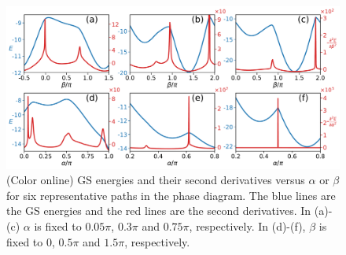 \documentclass[aps,prb,reprint,amsfonts,amsmath,amssymb,showpacs,groupedaddress,superscriptaddress]{revtex4-1}
\begin{document}
\begin{figure}
    \centering
    \includegraphics[width=\columnwidth]{fig/SecondDerivatives46.pdf}
    \caption{\label{fig:SecondDerivatives46} (Color online) GS energies and their second derivatives versus $\alpha$ or $\beta$ for six representative paths in the phase diagram.  The blue lines are the GS energies and the red lines are the second derivatives. In (a)-(c) $\alpha$ is fixed to $0.05\pi$, $0.3\pi$ and $0.75\pi$, respectively. In (d)-(f), $\beta$ is fixed to $0$, $0.5\pi$ and $1.5\pi$, respectively.}
\end{figure}
\end{document}
